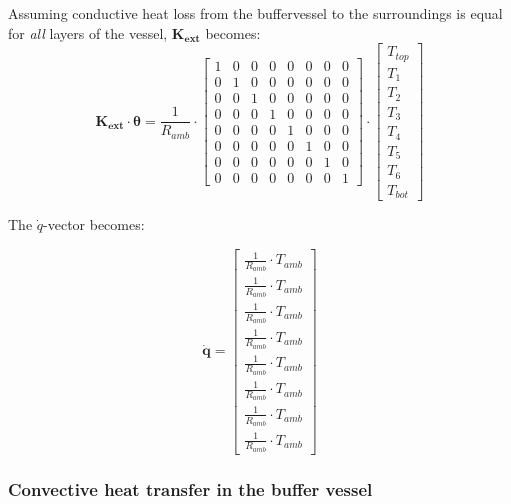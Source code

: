 \begin{scriptsize}
	Assuming conductive heat loss from the buffervessel to the surroundings is equal for \emph{all} layers of the vessel, $\mathbf{K_{ext}}$ becomes:
	\begin{equation}
		\mathbf{K_{ext}} \cdot \boldsymbol{\theta} = \frac{1}{R_{amb}} \cdot
		\begin{bmatrix}
			1 & 0 & 0 & 0 & 0 & 0 & 0 & 0 \\
			0 &  1 & 0 & 0 & 0 & 0 & 0 & 0 \\
			0 & 0 &  1 & 0 & 0 & 0 & 0 & 0 \\
			0 & 0  & 0 &  1 & 0 & 0 & 0 & 0 \\
			0 & 0 & 0 & 0 &  1 & 0 & 0 & 0 \\
			0 & 0 & 0 & 0 & 0 &  1 & 0 & 0 \\
			0 & 0 & 0 & 0 & 0 & 0 &  1 & 0 \\
			0 & 0 & 0 & 0 & 0 & 0 & 0 & 1
		\end{bmatrix}
		\cdot
		\begin{bmatrix}
			T_{top} \\
			T_{1} \\
			T_{2} \\
			T_{3} \\
			T_{4} \\
			T_{5} \\
			T_{6} \\
			T_{bot}
		\end{bmatrix}
	\end{equation}
	
	The $\dot{q}$-vector becomes:
	
	\begin{equation}
		\mathbf{\dot{q}} = 
		\begin{bmatrix}
			\frac{1}{R_{amb}} \cdot T_{amb} \\
			\frac{1}{R_{amb}} \cdot T_{amb} \\
			\frac{1}{R_{amb}} \cdot T_{amb} \\
			\frac{1}{R_{amb}} \cdot T_{amb} \\
			\frac{1}{R_{amb}} \cdot T_{amb} \\
			\frac{1}{R_{amb}} \cdot T_{amb} \\
			\frac{1}{R_{amb}} \cdot T_{amb} \\
			\frac{1}{R_{amb}} \cdot T_{amb}  
		\end{bmatrix}
	\end{equation}
	
	
	\subsubsection{Convective heat transfer in the buffer vessel}
	

\end{scriptsize}
